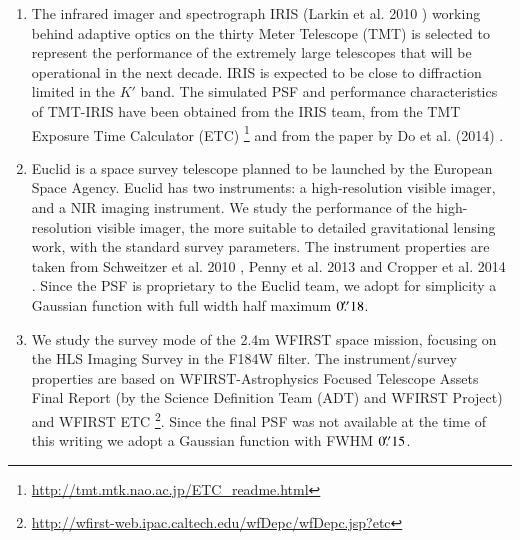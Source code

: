 \documentclass[a4paper,11pt]{article}
\begin{document}
\begin{enumerate}
\item The infrared imager and spectrograph IRIS (Larkin et al. 2010 \citep{2010SPIE.7735E..29L}) working behind adaptive optics on the thirty Meter Telescope (TMT) is selected to represent the performance of the extremely large telescopes that will be operational in the next decade. IRIS is expected to be close to diffraction limited in the $K'$ band. The simulated PSF and performance characteristics of TMT-IRIS have been obtained from the IRIS team, from the TMT Exposure Time Calculator (ETC) \footnote{\url{http://tmt.mtk.nao.ac.jp/ETC_readme.html}} and from the paper by Do et al. (2014) \citep{2014AJ....147...93D}.
    
\item Euclid is a space survey telescope planned to be launched by the European Space Agency. Euclid has two instruments: a high-resolution visible imager, and a NIR imaging instrument.
We study the performance of the high-resolution visible imager, the
more suitable to detailed gravitational lensing work, with the
standard survey parameters.  The instrument properties are taken from
Schweitzer et al. 2010
\cite{2010SPIE.7731E..1KS}, Penny et al. 2013
\cite{2013MNRAS.434....2P} and Cropper et al. 2014
\cite{2014SPIE.9143E..0JC}.
Since the PSF is proprietary to the Euclid team, we adopt for simplicity a Gaussian function with full width half maximum $0\hbox{$.\!\!^{\prime\prime}$}18$.
  
\item We study the survey mode of the 2.4m WFIRST space mission, focusing on the HLS Imaging Survey in the F184W filter.
The instrument/survey properties are based on WFIRST-Astrophysics Focused Telescope Assets Final Report (by the Science Definition Team (ADT) and WFIRST Project) and WFIRST ETC \footnote{\url{http://wfirst-web.ipac.caltech.edu/wfDepc/wfDepc.jsp?etc}}. Since the final PSF was not available at the time of this writing we adopt a Gaussian function with FWHM $0\hbox{$.\!\!^{\prime\prime}$}15$.
     

\end{enumerate}
\end{document}
